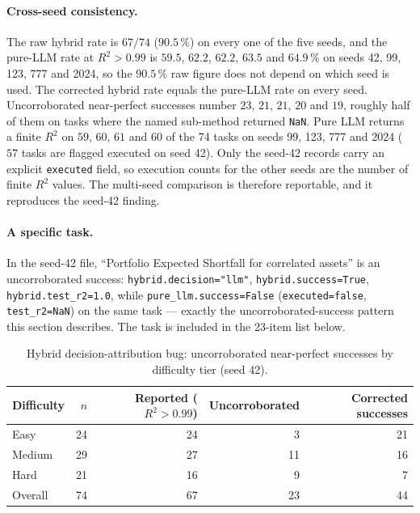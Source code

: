 \documentclass[twoside,11pt]{article}
\newcommand{\Rsq}{R^{2}}
\begin{document}
\paragraph{Cross-seed consistency.} The raw hybrid rate is $67/74$ ($90.5\,\%$) on every one of the five seeds, and the pure-LLM rate at $\Rsq>0.99$ is $59.5$, $62.2$, $62.2$, $63.5$ and $64.9\,\%$ on seeds 42, 99, 123, 777 and 2024, so the $90.5\,\%$ raw figure does not depend on which seed is used. The corrected hybrid rate equals the pure-LLM rate on every seed. Uncorroborated near-perfect successes number $23$, $21$, $21$, $20$ and $19$, roughly half of them on tasks where the named sub-method returned \texttt{NaN}. Pure LLM returns a finite $\Rsq$ on $59$, $60$, $61$ and $60$ of the 74 tasks on seeds 99, 123, 777 and 2024 ($57$ tasks are flagged executed on seed 42). Only the seed-42 records carry an explicit \texttt{executed} field, so execution counts for the other seeds are the number of finite $\Rsq$ values. The multi-seed comparison is therefore reportable, and it reproduces the seed-42 finding.

\paragraph{A specific task.} In the seed-42 file, ``Portfolio Expected Shortfall for correlated assets'' is an uncorroborated success: \texttt{hybrid.decision="llm"}, \texttt{hybrid.success=True}, \texttt{hybrid.test\_r2=1.0}, while \texttt{pure\_llm.success=False} (\texttt{executed=false}, \texttt{test\_r2=NaN}) on the same task --- exactly the uncorroborated-success pattern this section describes. The task is included in the 23-item list below.

\begin{table}[h]
\centering
\caption{Hybrid decision-attribution bug: uncorroborated near-perfect successes by
difficulty tier (seed 42).}
\label{tab:hybrid-bug-breakdown}
\begin{tabular}{lrrrr}
\toprule
Difficulty & $n$ & Reported ($\Rsq>0.99$) & Uncorroborated & Corrected successes \\
\midrule
Easy    & 24 & 24 & 3  & 21 \\
Medium  & 29 & 27 & 11 & 16 \\
Hard    & 21 & 16 & 9  & 7 \\
\midrule
Overall & 74 & 67 & 23 & 44 \\
\bottomrule
\end{tabular}
\end{table}
\end{document}
